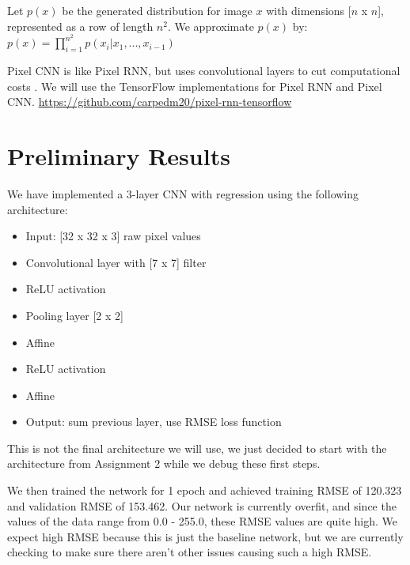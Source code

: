 \documentclass[10pt,twocolumn,letterpaper]{article}
\begin{document}
Let $p(x)$ be the generated distribution for image $x$ with dimensions [$n$ x $n$], represented as a row of length $n^2$. We approximate $p(x)$ by: \\
$p(x) = \prod_{i=1}^{n^2} p(x_i | x_1, ... , x_{i-1} )$

Pixel CNN is like Pixel RNN, but uses convolutional layers to cut computational costs \cite{pixelCNN}. We will use the TensorFlow implementations for Pixel RNN and Pixel CNN. \url{https://github.com/carpedm20/pixel-rnn-tensorflow}


\section{Preliminary Results}
We have implemented a 3-layer CNN with regression using the following architecture: 

\begin{itemize}
\item Input: [32 x 32 x 3] raw pixel values
\item Convolutional layer with [7 x 7] filter
\item ReLU activation
\item Pooling layer [2 x 2]
\item Affine
\item ReLU activation
\item Affine
\item Output: sum previous layer, use RMSE loss function
\end{itemize}

This is not the final architecture we will use, we just decided to start with the architecture from Assignment 2 while we debug these first steps. 

We then trained the network for 1 epoch and achieved training RMSE of 120.323 and validation RMSE of 153.462. Our network is currently overfit, and since the values of the data range from 0.0 - 255.0, these RMSE values are quite high. We expect high RMSE because this is just the baseline network, but we are currently checking to make sure there aren't other issues causing such a high RMSE.
\end{document}
